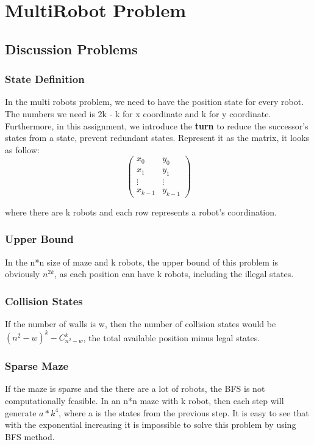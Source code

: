 \documentclass{article}
\begin{document}
\clearpage
\section{MultiRobot Problem}

\subsection{Discussion Problems}
\subsubsection{State Definition}
\begin{flushleft}
In the multi robots problem, we need to have the position state for every robot. The numbers we need is 2k - k for x coordinate and k for y coordinate. Furthermore, in this assignment, we introduce the \textbf{turn} to reduce the successor's states from a state, prevent redundant states. Represent it as the matrix, it looks as follow:
$$\begin{pmatrix}
x_0 & y_0 \\
x_1 & y_1 \\
\vdots & \vdots \\	
x_{k-1} & y_{k-1}
\end{pmatrix}$$

where there are k robots and each row represents a robot's coordination.
\end{flushleft}

\subsubsection{Upper Bound}
\begin{flushleft}
In the n*n size of maze and k robots, the upper bound of this problem is obviously $n^{2k}$, as each position can have k robots, including the illegal states.
\end{flushleft}

\subsubsection{Collision States}
\begin{flushleft}
If the number of walls is w, then the number of collision states would be $(n^2-w)^k - C_{n^2-w}^k$, the total available position minus legal states.
\end{flushleft}

\subsubsection{Sparse Maze}
\begin{flushleft}
If the maze is sparse and the there are a lot of robots, the BFS is not computationally feasible. In an n*n maze with k robot, then each step will generate $a*k^4$, where a is the states from the previous step. It is easy to see that  with the exponential increasing it is impossible to solve this problem by using BFS method.
\end{flushleft}
\end{document}
